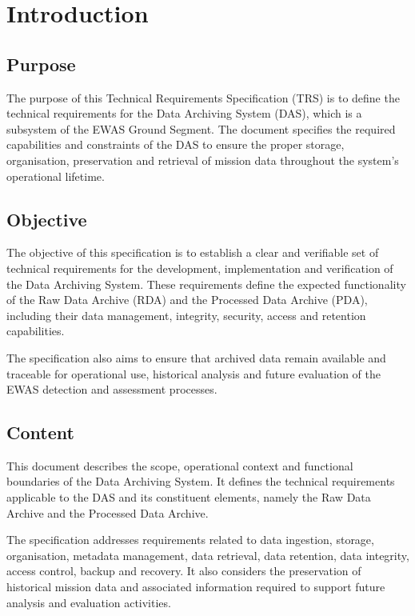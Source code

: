\section{Introduction}

\subsection{Purpose}

The purpose of this Technical Requirements Specification (TRS) is to define the technical requirements for the Data Archiving System (DAS), which is a subsystem of the EWAS Ground Segment. The document specifies the required capabilities and constraints of the DAS to ensure the proper storage, organisation, preservation and retrieval of mission data throughout the system's operational lifetime.

\subsection{Objective}

The objective of this specification is to establish a clear and verifiable set of technical requirements for the development, implementation and verification of the Data Archiving System. These requirements define the expected functionality of the Raw Data Archive (RDA) and the Processed Data Archive (PDA), including their data management, integrity, security, access and retention capabilities.

The specification also aims to ensure that archived data remain available and traceable for operational use, historical analysis and future evaluation of the EWAS detection and assessment processes.

\subsection{Content}

This document describes the scope, operational context and functional boundaries of the Data Archiving System. It defines the technical requirements applicable to the DAS and its constituent elements, namely the Raw Data Archive and the Processed Data Archive.

The specification addresses requirements related to data ingestion, storage, organisation, metadata management, data retrieval, data retention, data integrity, access control, backup and recovery. It also considers the preservation of historical mission data and associated information required to support future analysis and evaluation activities.

